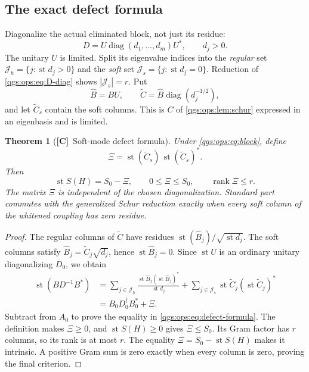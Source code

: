 \documentclass[11pt,oneside]{article}
\numberwithin{equation}{section}
\theoremstyle{plain}
\newtheorem{theorem}{Theorem}[section]
\theoremstyle{definition}
\theoremstyle{remark}
\DeclareMathOperator{\st}{st}
\DeclareMathOperator{\diag}{diag}
\DeclareMathOperator{\rank}{rank}
\newcommand{\abs}[1]{\left|#1\right|}
\newcommand{\TC}{\textcolor{TierC}{\textsf{\bfseries[C]}}}
\begin{document}
\subsection{The exact defect formula}
Diagonalize the actual eliminated block, not just its residue:
\begin{equation}\label{qgs:ops:eq:D-diag}
 D=U\diag(d_1,\ldots,d_m)U^*,\qquad d_j>0.
\end{equation}
The unitary $U$ is limited. Split its eigenvalue indices into the \emph{regular} set $\mathcal J_h=\{j:\st d_j>0\}$ and the \emph{soft} set $\mathcal J_s=\{j:\st d_j=0\}$. Reduction of \eqref{qgs:ops:eq:D-diag} shows $\abs{\mathcal J_s}=r$. Put
\begin{equation}\label{qgs:ops:eq:C-columns}
 \widehat B=BU,\qquad
 \widetilde C=\widehat B\diag(d_j^{-1/2}),
\end{equation}
and let $\widetilde C_s$ contain the soft columns. This is $C$ of \cref{qgs:ops:lem:schur} expressed in an eigenbasis and is limited.

\begin{theorem}[\TC\ Soft-mode defect formula]\label{qgs:ops:thm:defect}
Under \eqref{qgs:ops:eq:block}, define
\begin{equation}\label{qgs:ops:eq:Delta}
 \Xi=\st(\widetilde C_s)\,\st(\widetilde C_s)^*.
\end{equation}
Then
\begin{equation}\label{qgs:ops:eq:defect-formula}
 \boxed{\st S(H)=S_0-\Xi,\qquad
 0\le\Xi\le S_0,\qquad \rank\Xi\le r.}
\end{equation}
The matrix $\Xi$ is independent of the chosen diagonalization. Standard part commutes with the generalized Schur reduction exactly when every soft column of the whitened coupling has zero residue.
\end{theorem}
\begin{proof}
The regular columns of $\widetilde C$ have residues $\st(\widehat B_j)/\sqrt{\st d_j}$. The soft columns satisfy $\widehat B_j=\widetilde C_j\sqrt{d_j}$, hence $\st\widehat B_j=0$. Since $\st U$ is an ordinary unitary diagonalizing $D_0$, we obtain
\begin{align*}
 \st(BD^{-1}B^*)
 &=\sum_{j\in\mathcal J_h}\frac{\st\widehat B_j(\st\widehat B_j)^*}{\st d_j}
    +\sum_{j\in\mathcal J_s}\st\widetilde C_j(\st\widetilde C_j)^*\\
 &=B_0D_0^\dagger B_0^*+\Xi.
\end{align*}
Subtract from $A_0$ to prove the equality in \eqref{qgs:ops:eq:defect-formula}. The definition makes $\Xi\ge0$, and $\st S(H)\ge0$ gives $\Xi\le S_0$. Its Gram factor has $r$ columns, so its rank is at most $r$. The equality $\Xi=S_0-\st S(H)$ makes it intrinsic. A positive Gram sum is zero exactly when every column is zero, proving the final criterion.
\end{proof}
\end{document}

